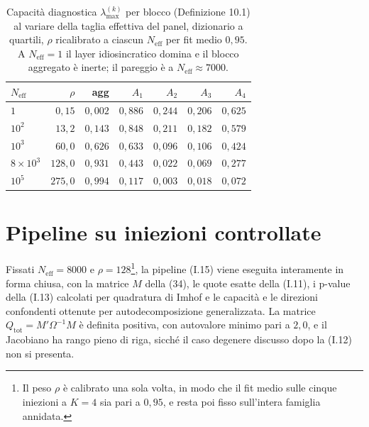 \documentclass[11pt,a4paper]{article}
\newcommand{\Neff}{N_{\mathrm{eff}}}
\begin{document}
\begin{table}[t]
\centering\small
\caption{Capacit\`a diagnostica $\lambda_{\max}^{(k)}$ per blocco (Definizione 10.1) al variare della taglia effettiva del panel, dizionario a quartili, $\rho$ ricalibrato a ciascun $\Neff$ per fit medio $0{,}95$. A $\Neff=1$ il layer idiosincratico domina e il blocco aggregato \`e inerte; il pareggio \`e a $\Neff\approx7000$.}
\label{tab:capacita}
\begin{tabular}{lrrrrrr}
\toprule
$\Neff$ & $\rho$ & agg & $A_1$ & $A_2$ & $A_3$ & $A_4$\\
\midrule
$1$ & $0{,}15$ & $0{,}002$ & $0{,}886$ & $0{,}244$ & $0{,}206$ & $0{,}625$\\
$10^2$ & $13{,}2$ & $0{,}143$ & $0{,}848$ & $0{,}211$ & $0{,}182$ & $0{,}579$\\
$10^3$ & $60{,}0$ & $0{,}626$ & $0{,}633$ & $0{,}096$ & $0{,}106$ & $0{,}424$\\
$8\times10^3$ & $128{,}0$ & $0{,}931$ & $0{,}443$ & $0{,}022$ & $0{,}069$ & $0{,}277$\\
$10^5$ & $275{,}0$ & $0{,}994$ & $0{,}117$ & $0{,}003$ & $0{,}018$ & $0{,}072$\\
\bottomrule
\end{tabular}
\end{table}

\section{Pipeline su iniezioni controllate}\label{sec:pipeline}
Fissati $\Neff=8000$ e $\rho=128$\footnote{Il peso $\rho$ \`e calibrato una sola volta, in modo che il fit medio sulle cinque iniezioni a $K=4$ sia pari a $0{,}95$, e resta poi fisso sull'intera famiglia annidata.}, la pipeline (I.15) viene eseguita interamente in forma chiusa, con la matrice $M$ della (34), le quote esatte della (I.11), i p-value della (I.13) calcolati per quadratura di Imhof e le capacit\`a e le direzioni confondenti ottenute per autodecomposizione generalizzata. La matrice $Q_{\mathrm{tot}}=M'\Omega^{-1}M$ \`e definita positiva, con autovalore minimo pari a $2{,}0$, e il Jacobiano ha rango pieno di riga, sicch\'e il caso degenere discusso dopo la (I.12) non si presenta.
\end{document}

